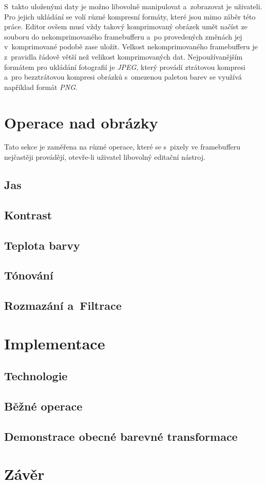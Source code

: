 \documentclass[11pt, a4paper, titlepage]{article}
\begin{document}
S~takto uloženými daty je možno libovolně manipulovat a~zobrazovat je uživateli.
Pro jejich ukládání se volí různé kompresní formáty, které jsou mimo záběr této práce.
Editor ovšem musí vždy takový komprimovaný obrázek umět načíst ze souboru do nekomprimovaného framebufferu a~po provedených změnách jej v~komprimované podobě zase uložit. Velkost nekomprimovaného  framebufferu je z~pravidla řádově větší než velikost komprimovaných dat.
Nejpoužívanějším formátem pro ukládání fotografií je \emph{JPEG}, který provádí ztrátovou kompresi a~pro bezztrátovou kompresi obrázků s~omezenou paletou barev se využívá například formát \emph{PNG}.

\section{Operace nad obrázky}
Tato sekce je zaměřena na různé operace, které se s~pixely ve framebufferu nejčastěji provádějí, otevře-li uživatel libovolný editační nástroj.
\subsection{Jas}
\subsection{Kontrast}
\subsection{Teplota barvy}
\subsection{Tónování}
\subsection{Rozmazání a~Filtrace}
\section{Implementace}
\subsection{Technologie}
\subsection{Běžné operace}
\subsection{Demonstrace obecné barevné transformace}

\section{Závěr}

\newpage


\begin{flushleft}
  
\end{flushleft}

\end{document}
